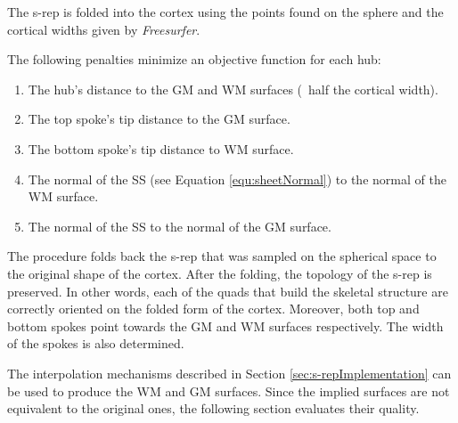\documentclass[a4paper,twoside]{article}
\begin{document}
The s-rep is folded into the cortex
using the points found on the sphere and
the cortical widths given by \textit{Freesurfer}. 

The following penalties minimize an objective function for each hub:

\begin{enumerate}
 \item The hub's distance to the GM and WM surfaces (~half the cortical width).
 \item The top spoke's tip distance to the GM surface.
 \item The bottom spoke's tip distance to WM surface.
 \item The normal of the SS (see Equation \ref{equ:sheetNormal}) to the normal of the WM surface.
 \item The normal of the SS to the normal of the GM surface.
\end{enumerate}



The procedure folds back the s-rep that was sampled on the spherical space to the original shape of the cortex. 
After the folding, the topology of the s-rep is preserved. 
In other words, each of the quads that build the skeletal structure 
are correctly oriented on the folded form of the cortex. 
Moreover, both top and bottom spokes point towards the GM and WM surfaces respectively. The width of the
spokes is also determined.

The interpolation mechanisms described in Section \ref{sec:s-repImplementation} can 
be used to produce the WM and GM surfaces. 
Since the implied surfaces are not equivalent to the original ones, the following section evaluates 
their quality. 
\end{document}
